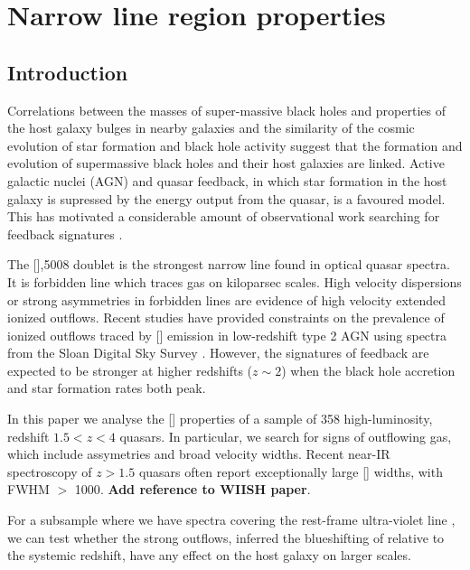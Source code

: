 \chapter{Narrow line region properties}\label{ch:nlr} 

\section{Introduction}

Correlations between the masses of super-massive black holes and properties of the host galaxy bulges in nearby galaxies \citep{gebhardt00,ferrarese00} and the similarity of the cosmic evolution of star formation and black hole activity \citep{boyle98,madau14} suggest that the formation and evolution of supermassive black holes and their host galaxies are linked. 
Active galactic nuclei (AGN) and quasar feedback, in which star formation in the host galaxy is supressed by the energy output from the quasar, is a favoured model.
This has motivated a considerable amount of observational work searching for feedback signatures \citep[for recent reviews, see][]{alexander12,fabian12,heckman14}. 

The [],5008 doublet is the strongest narrow line found in optical quasar spectra.
It is forbidden line which traces gas on kiloparsec scales.  
High velocity dispersions or strong asymmetries in forbidden lines are evidence of high velocity extended ionized outflows.
Recent studies have provided constraints on the prevalence of ionized outflows traced by [] emission in low-redshift type 2 AGN \citep[e.g.][]{mullaney13,zakamska14} using spectra from the Sloan Digital Sky Survey \citep[SDSS;][]{york00}. 
However, the signatures of feedback are expected to be stronger at higher redshifts ($z\sim2$) when the black hole accretion and star formation rates both peak. 

In this paper we analyse the [] properties of a sample of 358 high-luminosity, redshift $1.5 < z < 4$ quasars. 
In particular, we search for signs of outflowing gas, which include assymetries and broad velocity widths. 
Recent near-IR spectroscopy of $z>1.5$ quasars often report exceptionally large [] widths, with FWHM $>$ 1000\kms \citep[e.g.][]{netzer04,nesvadba08,kim13,brusa15,carniani15,perna15}. 
{\bf Add reference to WIISH paper}. 

For a subsample where we have spectra covering the rest-frame ultra-violet line , we can test whether the strong outflows, inferred the blueshifting of  relative to the systemic redshift, have any effect on the host galaxy on larger scales. 

